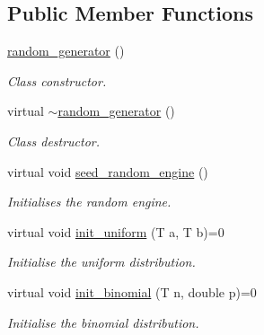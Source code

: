 \subsection*{Public Member Functions}
\begin{DoxyCompactItemize}
\item 
\mbox{\label{classlgraph_1_1utils_1_1random__generator_af4f4ba363f6f72d3ded2dba9e97079bb}} 
\hyperlink{classlgraph_1_1utils_1_1random__generator_af4f4ba363f6f72d3ded2dba9e97079bb}{random\+\_\+generator} ()
\begin{DoxyCompactList}\small\item\em Class constructor. \end{DoxyCompactList}\item 
\mbox{\label{classlgraph_1_1utils_1_1random__generator_a87783727d9e3a109bc3ed0631edad69b}} 
virtual \hyperlink{classlgraph_1_1utils_1_1random__generator_a87783727d9e3a109bc3ed0631edad69b}{$\sim$random\+\_\+generator} ()
\begin{DoxyCompactList}\small\item\em Class destructor. \end{DoxyCompactList}\item 
\mbox{\label{classlgraph_1_1utils_1_1random__generator_a4eb6998070eecb59bd89dca92d8a509c}} 
virtual void \hyperlink{classlgraph_1_1utils_1_1random__generator_a4eb6998070eecb59bd89dca92d8a509c}{seed\+\_\+random\+\_\+engine} ()
\begin{DoxyCompactList}\small\item\em Initialises the random engine. \end{DoxyCompactList}\item 
virtual void \hyperlink{classlgraph_1_1utils_1_1random__generator_a129da597bed5b08e9c7e5a3ddce4287c}{init\+\_\+uniform} (T a, T b)=0
\begin{DoxyCompactList}\small\item\em Initialise the uniform distribution. \end{DoxyCompactList}\item 
virtual void \hyperlink{classlgraph_1_1utils_1_1random__generator_a71976e6ecbbd49de85ac270085832df1}{init\+\_\+binomial} (T n, double p)=0
\begin{DoxyCompactList}\small\item\em Initialise the binomial distribution. \end{DoxyCompactList}\item 

\end{DoxyCompactItemize}
